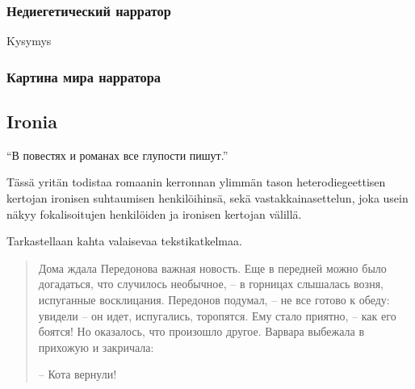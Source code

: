 \documentclass[12pt,a4paper]{article}
\begin{document}
\subsubsection{Недиегетический нарратор}

Kysymys

\subsubsection{Картина мира нарратора}


\subsection{Ironia}

\enquote{В повестях и романах все глупости пишут.} \parencite[54]{sologub2004}



Tässä yritän todistaa romaanin kerronnan ylimmän tason heterodiegeettisen kertojan ironisen suhtaumisen henkilöihinsä, sekä vastakkainasettelun, joka usein näkyy fokalisoitujen henkilöiden ja ironisen kertojan välillä.
% 
% 
% 
%

Tarkastellaan kahta valaisevaa tekstikatkelmaa.

\begin{quote}
Дома ждала Передонова важная новость. Еще в передней можно
было догадаться, что случилось необычное, – в горницах слышалась 
возня, испуганные восклицания. Передонов подумал, – не все
готово к обеду: увидели – он идет, испугались, торопятся. Ему стало
приятно, – как его боятся! Но оказалось, что произошло другое. 
Варвара выбежала в прихожую и закричала:

– Кота вернули!

\parencite[171.]{sologub2004}

\end{quote}
\end{document}
